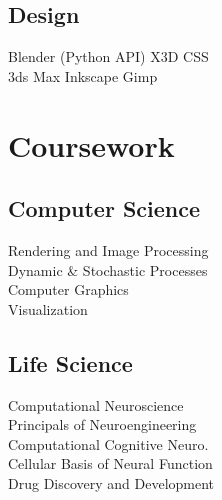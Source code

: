 \documentclass[]{deedy-resume-openfont}
\begin{document}
\begin{minipage}[t]{0.33\textwidth}
\subsection{Design}
Blender (Python API) \textbullet{} X3D \textbullet{} CSS \\ 
3ds Max \textbullet{} Inkscape \textbullet{} Gimp \\
\sectionsep


\section{Coursework}
\subsection{Computer Science}
Rendering and Image Processing \\
Dynamic \& Stochastic Processes \\
Computer Graphics \\
Visualization \\
\sectionsep

\subsection{Life Science}
Computational Neuroscience \\
Principals of Neuroengineering \\
Computational Cognitive Neuro. \\
Cellular Basis of Neural Function \\
Drug Discovery and Development \\
\sectionsep

%
%

\end{minipage} 
\hfill
\end{document}
